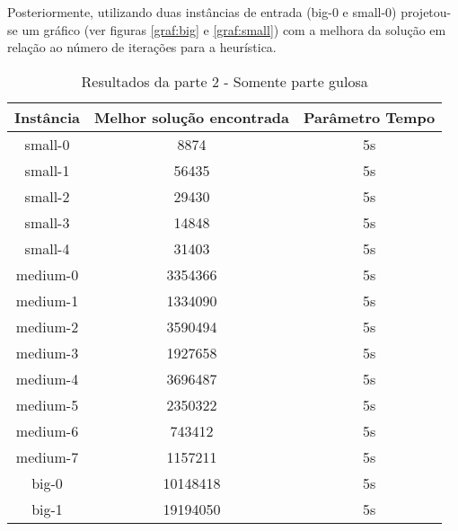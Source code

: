 \documentclass[11pt,letterpaper]{article}
\begin{document}
Posteriormente, utilizando duas instâncias de entrada (big-0 e
small-0) projetou-se um gráfico (ver figuras  \ref{graf:big} e \ref{graf:small}) com a melhora da
solução em relação ao número de iterações para a heurística.

\addtocounter{footnote}{1}

\begin{table}[h!]
  \begin{centering}
    \begin{tabular}{|c|c|c|}
      \hline 
      Instância & Melhor solução encontrada & Parâmetro Tempo  \tabularnewline
      \hline 
      \hline 
      small-0 & 8874 & 5s \tabularnewline %
      \hline 
      small-1 & 56435 & 5s  \tabularnewline %
      \hline 
      small-2 & 29430 & 5s \tabularnewline %
      \hline 
      small-3 & 14848 & 5s \tabularnewline %
      \hline 
      small-4 & 31403 & 5s \tabularnewline %
      \hline 
      medium-0 & 3354366 & 5s \tabularnewline %
      \hline 
      medium-1 & 1334090 & 5s \tabularnewline %
      \hline 
      medium-2 & 3590494 & 5s \tabularnewline %
      \hline 
      medium-3 & 1927658 & 5s \tabularnewline %
      \hline 
      medium-4 & 3696487 & 5s \tabularnewline %
      \hline 
      medium-5 & 2350322 & 5s \tabularnewline %
      \hline 
      medium-6 & 743412 & 5s \tabularnewline %
      \hline 
      medium-7 & 1157211 & 5s \tabularnewline %
      \hline 
      big-0 & 10148418 & 5s \tabularnewline %
      \hline 
      big-1 & 19194050 & 5s \tabularnewline %
      \hline 

    \end{tabular}
    \par\end{centering}
  \caption{Resultados da parte 2 - Somente parte gulosa}
  \label{tab:gul}
\end{table}
\end{document}
